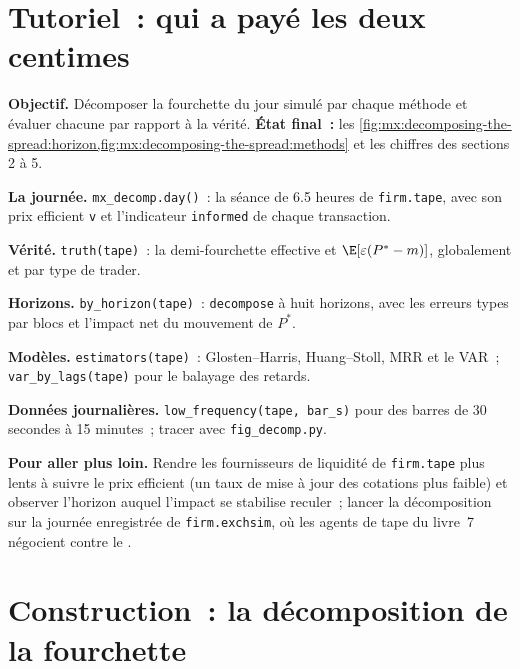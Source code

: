 \section{Tutoriel~: qui a payé les deux centimes}\label{tut:mx:decomposing-the-spread:tut}

\begin{tutorial}
\textbf{Objectif.} Décomposer la fourchette du jour simulé par chaque méthode et évaluer chacune par rapport à la vérité.
\textbf{État final~:} les \cref{fig:mx:decomposing-the-spread:horizon,fig:mx:decomposing-the-spread:methods} et les chiffres des sections 2 à 5.
\begin{tutsteps}
\item \textbf{La journée.} \texttt{mx\_decomp.day()}~: la séance de 6.5 heures de \texttt{firm.tape}, avec son prix efficient \texttt{v} et
l'indicateur \texttt{informed} de chaque transaction.
\item \textbf{Vérité.} \texttt{truth(tape)}~: la demi-fourchette effective et $\E[\varepsilon(P^\ast-m)]$, globalement et par type de trader.
\item \textbf{Horizons.} \texttt{by\_horizon(tape)}~: \texttt{decompose} à huit horizons, avec les erreurs types par blocs et l'impact net du mouvement de $P^\ast$.
\item \textbf{Modèles.} \texttt{estimators(tape)}~: Glosten--Harris, Huang--Stoll, MRR et le VAR~; \texttt{var\_by\_lags(tape)} pour le balayage des retards.
\item \textbf{Données journalières.} \texttt{low\_frequency(tape, bar\_s)} pour des barres de 30 secondes à 15 minutes~; tracer avec \texttt{fig\_decomp.py}.
\end{tutsteps}
\textbf{Pour aller plus loin.} Rendre les fournisseurs de liquidité de \texttt{firm.tape} plus lents à suivre le prix efficient (un taux de mise à jour des cotations plus faible)
et observer l'horizon auquel l'impact se stabilise reculer~; lancer la décomposition sur la journée enregistrée de \texttt{firm.exchsim}, où les agents de tape du livre~7 négocient
contre le .
\end{tutorial}

\section{Construction~: la décomposition de la fourchette}\label{bld:mx:decomposing-the-spread:spreaddecomp}

